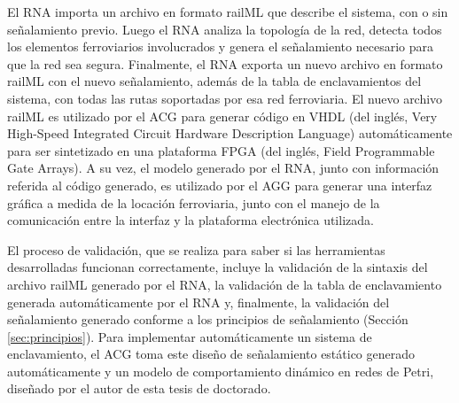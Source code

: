     El RNA importa un archivo en formato railML que describe el sistema, con o sin señalamiento previo. Luego el RNA analiza la topología de la red, detecta todos los elementos ferroviarios involucrados y genera el señalamiento necesario para que la red sea segura. Finalmente, el RNA exporta un nuevo archivo en formato railML con el nuevo señalamiento, además de la tabla de enclavamientos del sistema, con todas las rutas soportadas por esa red ferroviaria. El nuevo archivo railML es utilizado por el ACG para generar código en VHDL \cite{Paper_206} (del inglés, Very High-Speed Integrated Circuit Hardware Description Language) automáticamente para ser sintetizado en una plataforma FPGA \cite{Paper_8,Paper_25,Paper_34,Paper_46,Paper_49} (del inglés, Field Programmable Gate Arrays). A su vez, el modelo generado por el RNA, junto con información referida al código generado, es utilizado por el AGG para generar una interfaz gráfica a medida de la locación ferroviaria, junto con el manejo de la comunicación entre la interfaz y la plataforma electrónica utilizada.
    
    El proceso de validación, que se realiza para saber si las herramientas desarrolladas funcionan correctamente, incluye la validación de la sintaxis del archivo railML generado por el RNA, la validación de la tabla de enclavamiento generada automáticamente por el RNA y, finalmente, la validación del señalamiento generado conforme a los principios de señalamiento (Sección \ref{sec:principios}). Para implementar automáticamente un sistema de enclavamiento, el ACG toma este diseño de señalamiento estático generado automáticamente y un modelo de comportamiento dinámico en redes de Petri, diseñado por el autor de esta tesis de doctorado. 



%
